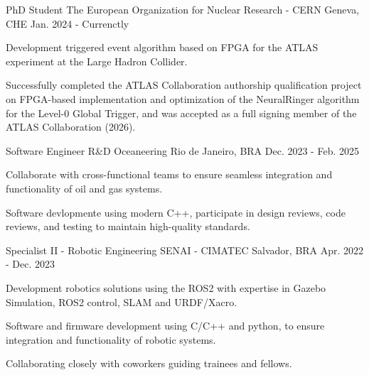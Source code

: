 

\begin{cventries}
\cventry
   {PhD Student} %
   {The European Organization for Nuclear Research - CERN} %
   {Geneva, CHE} %
   {Jan. 2024 - Currenctly} %
   {
     \begin{cvitems} %
       \item {Development triggered event algorithm based on FPGA for the ATLAS experiment at the Large Hadron Collider.}
       \item {Successfully completed the ATLAS Collaboration authorship qualification project on FPGA-based implementation and optimization of the NeuralRinger algorithm for the Level-0 Global Trigger, and was accepted as a full signing member of the ATLAS Collaboration (2026).}
     \end{cvitems}
   }

\cventry
  {Software Engineer R\&D} %
  {Oceaneering} %
  {Rio de Janeiro, BRA} %
  {Dec. 2023 - Feb. 2025} %
  {
    \begin{cvitems} %
      \item {Collaborate with cross-functional teams to ensure seamless integration and functionality of oil and gas systems.}
      \item {Software devlopmente using modern C++, participate in design reviews, code reviews, and testing to maintain high-quality standards.}
    \end{cvitems}
  }

\cventry
  {Specialist II - Robotic Engineering} %
  {SENAI - CIMATEC} %
  {Salvador, BRA} %
  {Apr. 2022 - Dec. 2023} %
  {
    \begin{cvitems} %
      \item {Development robotics solutions using the ROS2 with expertise in Gazebo Simulation, ROS2 control, SLAM and URDF/Xacro.}
      \item {Software and firmware development using C/C++ and python, to ensure integration and functionality of robotic systems.}
      \item {Collaborating closely with coworkers guiding trainees and fellows.}
    \end{cvitems}
  }


\end{cventries}
